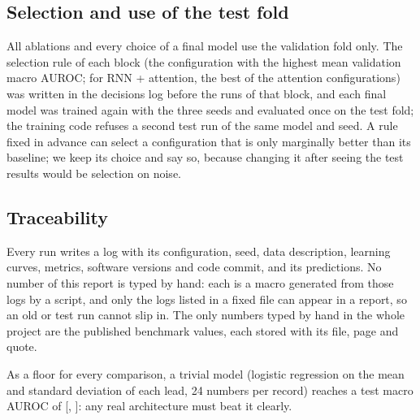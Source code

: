 \subsection{Selection and use of the test fold}

All ablations and every choice of a final model use the validation fold only. The selection rule of each
block (the configuration with the highest mean validation macro AUROC; for RNN + attention, the best of
the attention configurations) was written in the decisions log before the runs of that block, and each
final model was trained again with the three seeds and evaluated once on the test fold; the training code
refuses a second test run of the same model and seed. A rule fixed in advance can select a configuration
that is only marginally better than its baseline; we keep its choice and say so, because changing it
after seeing the test results would be selection on noise.

\subsection{Traceability}

Every run writes a log with its configuration, seed, data description, learning curves, metrics,
software versions and code commit, and its predictions. No number of this report is typed by hand: each
is a macro generated from those logs by a script, and only the logs listed in a fixed file can appear in a
report, so an old or test run cannot slip in. The only numbers typed by hand in the whole project are the
published benchmark values, each stored with its file, page and quote.

As a floor for every comparison, a trivial model (logistic regression on the mean and standard deviation
of each lead, 24 numbers per record) reaches a test macro AUROC of \trivialTestMacroAuroc{}
[\trivialTestMacroAurocLo{}, \trivialTestMacroAurocHi{}]: any real architecture must beat it clearly.

